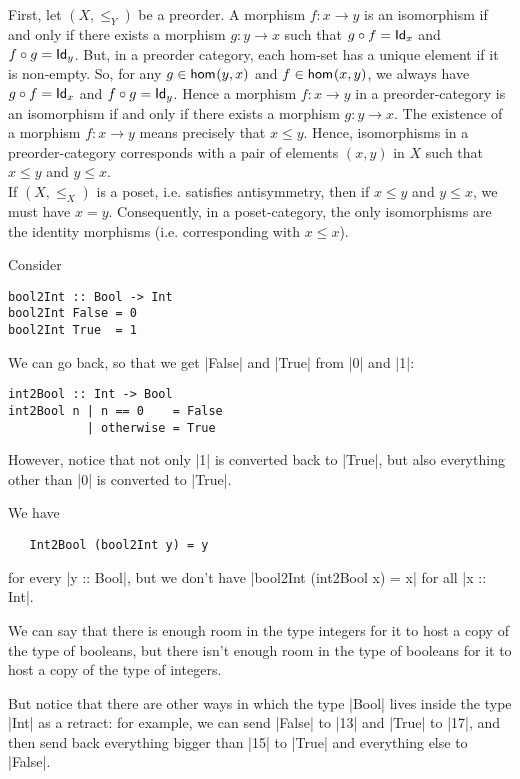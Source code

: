 \begin{solution}\label{sol:iso_in_posetcategory}
First, let $(X,\leq_Y)$ be a preorder. A morphism $f:x\to y$ is an isomorphism if and only if there exists a morphism $g: y\to x$ such that $\co{f}{g}=\Id[x]$ and $\co{g}{f}=\Id[y]$. But, in a preorder category, each hom-set has a unique element if it is non-empty. So, for any $g\in \Hom{y}{x}$ and $f\in \Hom{x}{y}$, we always have $\co{f}{g}=\Id[x]$ and $\co{g}{f}=\Id[y]$. Hence a morphism $f:x\to y$ in a preorder-category is an isomorphism if and only if there exists a morphism $g:y\to x$. The existence of a morphism $f:x\to y$ means precisely that $x\leq y$. Hence, isomorphisms in a preorder-category corresponds with a pair of elements $(x,y)$ in $X$ such that $x\leq y$ and $y\leq x$.\\
If $(X,\leq_X)$ is a poset, i.e. satisfies antisymmetry, then if $x\leq y$ and $y\leq x$, we must have $x=y$. Consequently, in a poset-category, the only isomorphisms are the identity morphisms (i.e. corresponding with $x\leq x$).
\end{solution}


\begin{solution}\label{sol:section-retraction-bool-int}
Consider
\begin{lstlisting}
bool2Int :: Bool -> Int
bool2Int False = 0
bool2Int True  = 1
\end{lstlisting}    

We can go back, so that we get |False| and |True| from |0| and |1|:
\begin{lstlisting}
int2Bool :: Int -> Bool
int2Bool n | n == 0    = False
           | otherwise = True
\end{lstlisting}
However, notice that not only |1| is converted back to |True|, but also everything other than |0| is converted to |True|.

We have
\begin{lstlisting}
   Int2Bool (bool2Int y) = y
\end{lstlisting}
for every |y :: Bool|, but we don't have |bool2Int (int2Bool x) = x| for all |x :: Int|.

We can say that there is enough room in the type integers for it to host a copy of the type of booleans, but there isn't enough room in the type of booleans for it to host a copy of the type of integers.

But notice that there are other ways in which the type |Bool| lives inside the type |Int| as a retract: for example, we can send |False| to |13| and |True| to |17|, and then send back everything bigger than |15| to |True| and everything else to |False|.
\end{solution}





